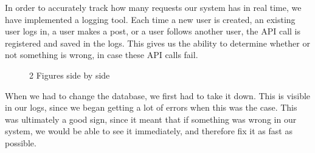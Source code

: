 In order to accurately track how many requests our system has in real time, we have implemented a logging tool. Each time a new user is created, an existing user logs in, a user makes a post, or a user follows another user, the API call is registered and saved in the logs. This gives us the ability to determine whether or not something is wrong, in case these API calls fail. 

\begin{figure}[H]
    \centering
    \qquad
    \caption{2 Figures side by side}%
    \label{fig:example}%
\end{figure}

When we had to change the database, we first had to take it down. This is visible in our logs, since we began getting a lot of errors when this was the case. This was ultimately a good sign, since it meant that if something was wrong in our system, we would be able to see it immediately, and therefore fix it as fast as possible.

